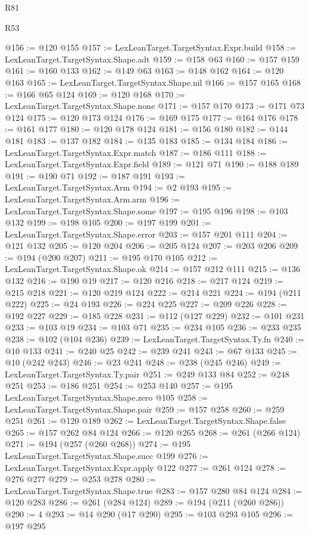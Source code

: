 \begin{lexlean}{R81}
\begin{lexlean}{R53}
\begin{coremodule}
{{{{{{{{{{{{{{{{{{{{{{{{{{{{{{{{{{{{{{{{{{{{{{{{{{{{{{{{{{{{{{{{{{{{{{{{{{{{{{{{{{{{{{{{{{{{{{{{{{{{{{{{{{{{{{{{@156 := @120 @155
@157 := LexLeanTarget.TargetSyntax.Expr.build
@158 := LexLeanTarget.TargetSyntax.Shape.adt
@159 := @158 @63
@160 := @157 @159
@161 := @160 @133
@162 := @149 @63
@163 := @148 @162
@164 := @120 @163
@165 := LexLeanTarget.TargetSyntax.Shape.nil
@166 := @157 @165
@168 := @166 @65 @124
@169 := @120 @168
@170 := LexLeanTarget.TargetSyntax.Shape.none
@171 := @157 @170
@173 := @171 @73 @124
@175 := @120 @173 @124
@176 := @169 @175
@177 := @164 @176
@178 := @161 @177
@180 := @120 @178 @124
@181 := @156 @180
@182 := @144 @181
@183 := @137 @182
@184 := @135 @183
@185 := @134 @184
@186 := LexLeanTarget.TargetSyntax.Expr.match
@187 := @186 @111
@188 := LexLeanTarget.TargetSyntax.Expr.field
@189 := @121 @71
@190 := @188 @189
@191 := @190 @71
@192 := @187 @191
@193 := LexLeanTarget.TargetSyntax.Arm
@194 := @2 @193
@195 := LexLeanTarget.TargetSyntax.Arm.arm
@196 := LexLeanTarget.TargetSyntax.Shape.some
@197 := @195 @196
@198 := @103 @132
@199 := @198 @105
@200 := @197 @199
@201 := LexLeanTarget.TargetSyntax.Shape.error
@203 := @157 @201 @111
@204 := @121 @132
@205 := @120 @204
@206 := @205 @124
@207 := @203 @206
@209 := @194 (@200 @207)
@211 := @195 @170 @105
@212 := LexLeanTarget.TargetSyntax.Shape.ok
@214 := @157 @212 @111
@215 := @136 @132
@216 := @190 @19
@217 := @120 @216
@218 := @217 @124
@219 := @215 @218
@221 := @120 @219 @124
@222 := @214 @221
@224 := @194 (@211 @222)
@225 := @24 @193
@226 := @224 @225
@227 := @209 @226
@228 := @192 @227
@229 := @185 @228
@231 := @112 (@127 @229)
@232 := @101 @231
@233 := @103 @19
@234 := @103 @71
@235 := @234 @105
@236 := @233 @235
@238 := @102 (@104 @236)
@239 := LexLeanTarget.TargetSyntax.Ty.fn
@240 := @10 @133
@241 := @240 @25
@242 := @239 @241
@243 := @67 @133
@245 := @10 (@242 @243)
@246 := @23 @241
@248 := @238 (@245 @246)
@249 := LexLeanTarget.TargetSyntax.Ty.pair
@251 := @249 @133 @84
@252 := @248 @251
@253 := @186 @251
@254 := @253 @140
@257 := @195 LexLeanTarget.TargetSyntax.Shape.zero @105
@258 := LexLeanTarget.TargetSyntax.Shape.pair
@259 := @157 @258
@260 := @259 @251
@261 := @120 @189
@262 := LexLeanTarget.TargetSyntax.Shape.false
@265 := @157 @262 @84 @124
@266 := @120 @265
@268 := @261 (@266 @124)
@271 := @194 (@257 (@260 @268))
@274 := @195 LexLeanTarget.TargetSyntax.Shape.succ @199
@276 := LexLeanTarget.TargetSyntax.Expr.apply @122
@277 := @261 @124
@278 := @276 @277
@279 := @253 @278
@280 := LexLeanTarget.TargetSyntax.Shape.true
@283 := @157 @280 @84 @124
@284 := @120 @283
@286 := @261 (@284 @124)
@289 := @194 (@211 (@260 @286))
@290 := 4
@293 := @14 @290 (@17 @290)
@295 := @103 @293 @105
@296 := @197 @295
}}}}}}}}}}}}}}}}}}}}}}}}}}}}}}}}}}}}}}}}}}}}}}}}}}}}}}}}}}}}}}}}}}}}}}}}}}}}}}}}}}}}}}}}}}}}}}}}}}}}}}}}}}}}}}}}
\end{coremodule}
\end{lexlean}
\end{lexlean}
